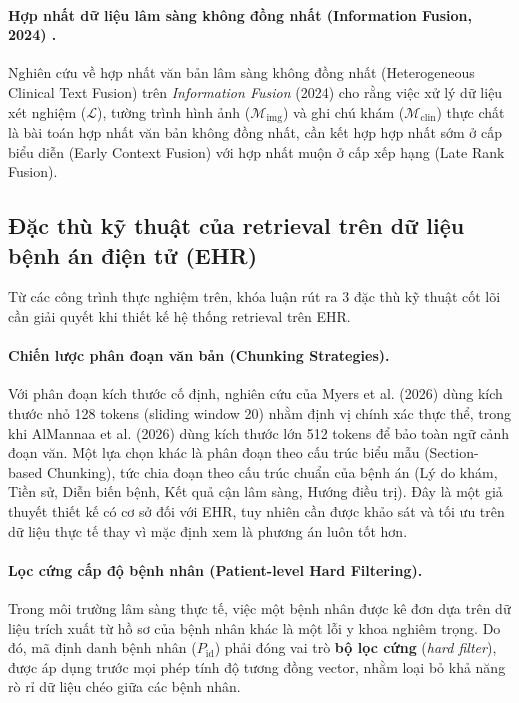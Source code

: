 \paragraph{Hợp nhất dữ liệu lâm sàng không đồng nhất (Information Fusion, 2024) \cite{fusion_review_2024}.}
Nghiên cứu về hợp nhất văn bản lâm sàng không đồng nhất (Heterogeneous Clinical Text Fusion) trên \emph{Information Fusion} (2024) cho rằng việc xử lý dữ liệu xét nghiệm ($\mathcal{L}$), tường trình hình ảnh ($\mathcal{M}_{\mathrm{img}}$) và ghi chú khám ($\mathcal{M}_{\mathrm{clin}}$) thực chất là bài toán hợp nhất văn bản không đồng nhất, cần kết hợp hợp nhất sớm ở cấp biểu diễn (Early Context Fusion) với hợp nhất muộn ở cấp xếp hạng (Late Rank Fusion).

\subsection{Đặc thù kỹ thuật của retrieval trên dữ liệu bệnh án điện tử (EHR)}

Từ các công trình thực nghiệm trên, khóa luận rút ra 3 đặc thù kỹ thuật cốt lõi cần giải quyết khi thiết kế hệ thống retrieval trên EHR.

\paragraph{Chiến lược phân đoạn văn bản (Chunking Strategies).}
Với phân đoạn kích thước cố định, nghiên cứu của Myers et al. (2026) dùng kích thước nhỏ 128 tokens (sliding window 20) nhằm định vị chính xác thực thể, trong khi AlMannaa et al. (2026) dùng kích thước lớn 512 tokens để bảo toàn ngữ cảnh đoạn văn. Một lựa chọn khác là phân đoạn theo cấu trúc biểu mẫu (Section-based Chunking), tức chia đoạn theo cấu trúc chuẩn của bệnh án (Lý do khám, Tiền sử, Diễn biến bệnh, Kết quả cận lâm sàng, Hướng điều trị). Đây là một giả thuyết thiết kế có cơ sở đối với EHR, tuy nhiên cần được khảo sát và tối ưu trên dữ liệu thực tế thay vì mặc định xem là phương án luôn tốt hơn.

\paragraph{Lọc cứng cấp độ bệnh nhân (Patient-level Hard Filtering).}
Trong môi trường lâm sàng thực tế, việc một bệnh nhân được kê đơn dựa trên dữ liệu trích xuất từ hồ sơ của bệnh nhân khác là một lỗi y khoa nghiêm trọng. Do đó, mã định danh bệnh nhân ($P_{\mathrm{id}}$) phải đóng vai trò \textbf{bộ lọc cứng} (\emph{hard filter}), được áp dụng trước mọi phép tính độ tương đồng vector, nhằm loại bỏ khả năng rò rỉ dữ liệu chéo giữa các bệnh nhân.

